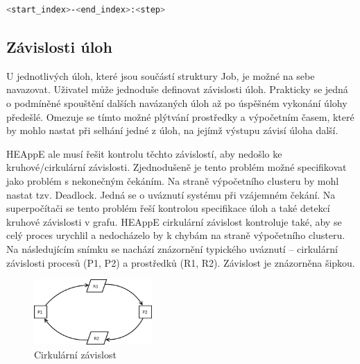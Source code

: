 \begin{lstlisting}[language=bash,caption={Struktura definice JobArrays}]
                            <start_index>-<end_index>:<step>
\end{lstlisting}

\subsection{Závislosti úloh}
U jednotlivých úloh, které jsou součástí struktury Job, je možné na sebe navazovat. Uživatel může jednoduše definovat závislosti úloh. Prakticky se jedná o podmíněné spouštění dalších navázaných úloh až po úspěšném vykonání úlohy předešlé. Omezuje se tímto možné plýtvání prostředky a výpočetním časem, které by mohlo nastat při selhání jedné z úloh, na jejímž výstupu závisí úloha další.

HEAppE ale musí řešit kontrolu těchto závislostí, aby nedošlo ke kruhové/cirkulární závislosti. Zjednodušeně je tento problém možné specifikovat jako problém s nekonečným čekáním. Na straně výpočetního clusteru by mohl nastat tzv. Deadlock. Jedná se o uváznutí systému při vzájemném čekání. Na superpočítači se tento problém řeší kontrolou specifikace úloh a také detekcí kruhové závislosti v grafu. HEAppE cirkulární závislost kontroluje také, aby se celý proces urychlil a nedocházelo by k chybám na straně výpočetního clusteru. Na následujícím snímku se nachází znázornění typického uváznutí – cirkulární závislosti procesů (P1, P2) a prostředků (R1, R2). Závislost je znázorněna šipkou.


\begin{figure}
	\centering
	\includegraphics[width=0.4\textwidth]{Figures/Process_deadlock.png}
	\caption{Cirkulární závislost \cite{OvBwjLleECKerU0E}}
	\label{fig:WritingThesis}
\end{figure}

\newpage
